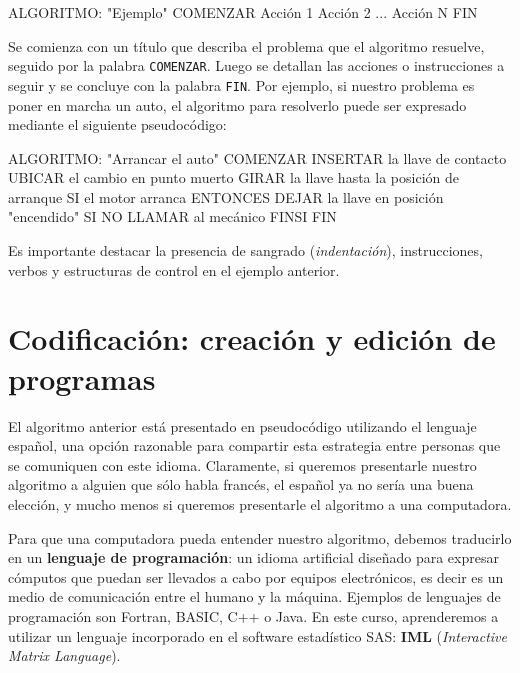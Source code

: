 \documentclass[
]{book}
\newenvironment{Shaded}{\begin{snugshade}}{\end{snugshade}}
\newcommand{\NormalTok}[1]{#1}
\begin{document}
\begin{Shaded}
\begin{Highlighting}[]
\NormalTok{ALGORITMO: "Ejemplo"}
\NormalTok{COMENZAR}
\NormalTok{    Acción 1}
\NormalTok{    Acción 2}
\NormalTok{    ...}
\NormalTok{    Acción N}
\NormalTok{FIN}
\end{Highlighting}
\end{Shaded}

Se comienza con un título que describa el problema que el algoritmo resuelve, seguido por la palabra \texttt{COMENZAR}. Luego se detallan las acciones o instrucciones a seguir y se concluye con la palabra \texttt{FIN}. Por ejemplo, si nuestro problema es poner en marcha un auto, el algoritmo para resolverlo puede ser expresado mediante el siguiente pseudocódigo:

\begin{Shaded}
\begin{Highlighting}[]
\NormalTok{ALGORITMO: "Arrancar el auto"}
\NormalTok{COMENZAR}
\NormalTok{    INSERTAR la llave de contacto}
\NormalTok{    UBICAR el cambio en punto muerto}
\NormalTok{    GIRAR la llave hasta la posición de arranque}
\NormalTok{    SI el motor arranca }
\NormalTok{        ENTONCES}
\NormalTok{            DEJAR la llave en posición "encendido"}
\NormalTok{        SI NO}
\NormalTok{            LLAMAR al mecánico}
\NormalTok{    FINSI}
\NormalTok{FIN}
\end{Highlighting}
\end{Shaded}

Es importante destacar la presencia de sangrado (\emph{indentación}), instrucciones, verbos y estructuras de control en el ejemplo anterior.

\hypertarget{codificaciuxf3n-creaciuxf3n-y-ediciuxf3n-de-programas}{%
\section{Codificación: creación y edición de programas}\label{codificaciuxf3n-creaciuxf3n-y-ediciuxf3n-de-programas}}

El algoritmo anterior está presentado en pseudocódigo utilizando el lenguaje español, una opción razonable para compartir esta estrategia entre personas que se comuniquen con este idioma. Claramente, si queremos presentarle nuestro algoritmo a alguien que sólo habla francés, el español ya no sería una buena elección, y mucho menos si queremos presentarle el algoritmo a una computadora.

Para que una computadora pueda entender nuestro algoritmo, debemos traducirlo en un \textbf{lenguaje de programación}: un idioma artificial diseñado para expresar cómputos que puedan ser llevados a cabo por equipos electrónicos, es decir es un medio de comunicación entre el humano y la máquina. Ejemplos de lenguajes de programación son Fortran, BASIC, C++ o Java. En este curso, aprenderemos a utilizar un lenguaje incorporado en el software estadístico SAS: \textbf{IML} (\emph{Interactive Matrix Language}).
\end{document}

